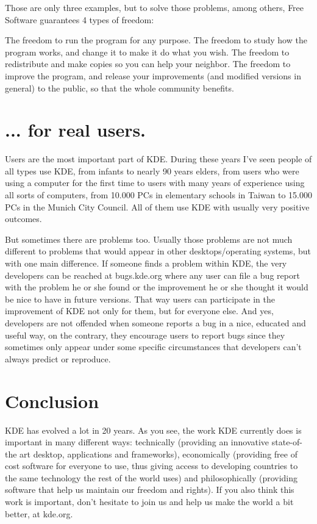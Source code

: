 Those are only three examples, but to solve those problems, among others, Free Software guarantees 4 types of freedom:

The freedom to run the program for any purpose.
The freedom to study how the program works, and change it to make it do what you wish.
The freedom to redistribute and make copies so you can help your neighbor.
The freedom to improve the program, and release your improvements (and modified versions in general) to the public, so that the whole community benefits.

\section*{... for real users.}

Users are the most important part of KDE. During these years I've seen people of all types use KDE, from infants to nearly 90 years elders, from users who were using a computer for the first time to users with many years of experience using all sorts of computers, from 10.000 PCs in elementary schools in Taiwan to 15.000 PCs in the Munich City Council. All of them use KDE with usually very positive outcomes.

But sometimes there are problems too. Usually those problems are not much different to problems that would appear in other desktops/operating systems, but with one main difference. If someone finds a problem within KDE, the very developers can be reached at bugs.kde.org where any user can file a bug report with the problem he or she found or the improvement he or she thought it would be nice to have in future versions. That way users can participate in the improvement of KDE not only for them, but for everyone else. And yes, developers are not offended when someone reports a bug in a nice, educated and useful way, on the contrary, they encourage users to report bugs since they sometimes only appear under some specific circumstances that developers can't always predict or reproduce.

\section*{Conclusion}
KDE has evolved a lot in 20 years. As you see, the work KDE currently does is important in many different ways: technically (providing an innovative state-of-the art desktop, applications and frameworks), economically (providing free of cost software for everyone to use, thus giving access to developing countries to the same technology the rest of the world uses) and philosophically (providing software that help us maintain our freedom and rights). If you also think this work is important, don't hesitate to join us and help us make the world a bit better, at kde.org.